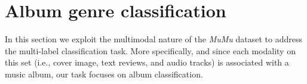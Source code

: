 


\section{Album genre classification}\label{sec:multi-class:classification}

In this section we exploit the multimodal nature of the \emph{MuMu} dataset to address the multi-label classification task.
More specifically, and since each modality on this set (i.e., cover image, text reviews, and audio tracks) is associated with a music album, our task focuses on album classification. %



